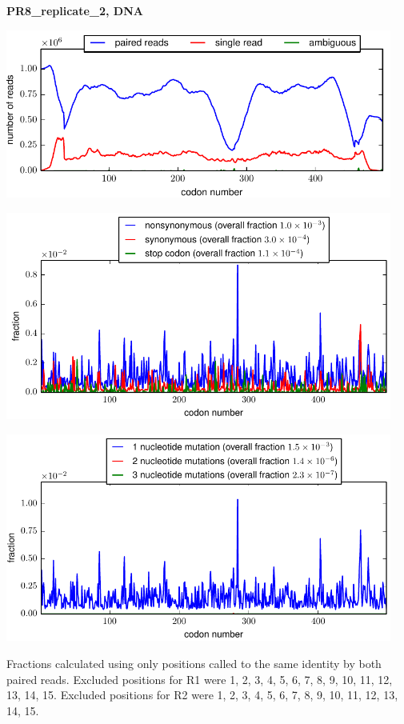 \documentclass[10pt,letterpaper]{article}
\begin{document}
\centerline{\Large \bf PR8\_replicate\_2, DNA}
\vspace{0.1in}

\centerline{\includegraphics[width=5in]{PR8_replicate_2_DNA_codondepth.pdf}}
\vspace{0.1in}

\centerline{\includegraphics[width=5in]{PR8_replicate_2_DNA_syn-ns-dist.pdf}}
\vspace{0.1in}

\centerline{\includegraphics[width=5in]{PR8_replicate_2_DNA_nmutspercodon-dist.pdf}}
\vspace{0.1in}

Fractions calculated using only positions called to the same identity by both paired reads.  Excluded positions for R1 were 1, 2, 3, 4, 5, 6, 7, 8, 9, 10, 11, 12, 13, 14, 15. 
 Excluded positions for R2 were 1, 2, 3, 4, 5, 6, 7, 8, 9, 10, 11, 12, 13, 14, 15. 
\end{document}
